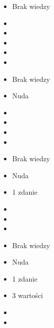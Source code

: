 \documentclass{beamer}
\begin{document}
\begin{frame}{}
	\begin{Large}
		\begin{itemize}
			\item Brak wiedzy
			\item 
			\item 
			\item 
			\item 
			\item 
		\end{itemize}
	\end{Large}
\end{frame}

\begin{frame}{}
	\begin{Large}
		\begin{itemize}
			\item Brak wiedzy
			\item Nuda
			\item 
			\item 
			\item 
			\item 
		\end{itemize}
	\end{Large}
\end{frame}

\begin{frame}{}
	\begin{Large}
		\begin{itemize}
			\item Brak wiedzy
			\item Nuda
			\item 1 zdanie
			\item 
			\item 
			\item 
		\end{itemize}
	\end{Large}
\end{frame}

\begin{frame}{}
	\begin{Large}
		\begin{itemize}
			\item Brak wiedzy
			\item Nuda
			\item 1 zdanie
			\item 3 wartości
			\item 
			\item 
		\end{itemize}
	\end{Large}
\end{frame}
\end{document}
